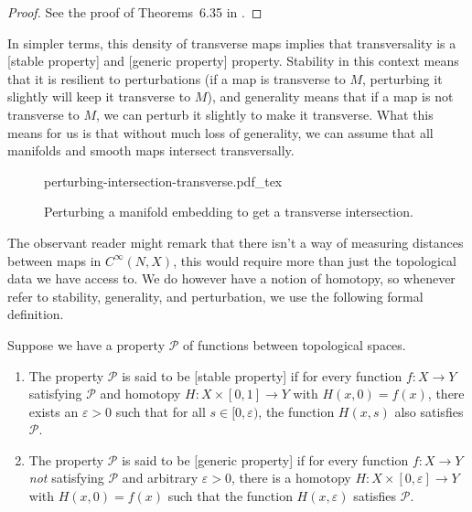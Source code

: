 \begin{proof}
	See the proof of Theorems~6.35 in \cite{lee2012smooth}.
\end{proof}

In simpler terms, this density of transverse maps implies that transversality is a [stable property] and [generic property] property. Stability in this context means that it is resilient to perturbations (if a map is transverse to $M$, perturbing it slightly will keep it transverse to $M$), and generality means that if a map is not transverse to $M$, we can perturb it slightly to make it transverse.
What this means for us is that without much loss of generality, we can assume that all manifolds and smooth maps intersect transversally.

\begin{figure}[ht]
	\centering
	{perturbing-intersection-transverse.pdf_tex}
	\medskip
	\caption{Perturbing a manifold embedding to get a transverse intersection.}\label{fig:perturbing-intersections-transverse}
\end{figure}

The observant reader might remark that there isn't a way of measuring distances between maps in $C^\infty(N,X)$, this would require more than just the topological data we have access to. We do however have a notion of homotopy, so whenever refer to stability, generality, and perturbation, we use the following formal definition.

\begin{definition}
	Suppose we have a property $\mathcal{P}$ of functions between topological spaces.
	\begin{enumerate}
		\item The property $\mathcal{P}$ is said to be [stable property] if for every function $f : X \to Y$ satisfying $\mathcal{P}$ and homotopy $H : X\times[0,1]\to Y$ with $H(x,0) = f(x)$, there exists an $\varepsilon>0$ such that for all $s\in [0,\varepsilon)$, the function $H(x,s)$ also satisfies $\mathcal{P}$.
		\item The property $\mathcal{P}$ is said to be [generic property] if for every function $f : X \to Y$ \emph{not} satisfying $\mathcal{P}$ and arbitrary $\varepsilon>0$, there is a homotopy $H : X\times [0,\varepsilon] \to Y$ with $H(x,0)=f(x)$ such that the function $H(x,\varepsilon)$ satisfies $\mathcal{P}$.
	\end{enumerate}
\end{definition}

